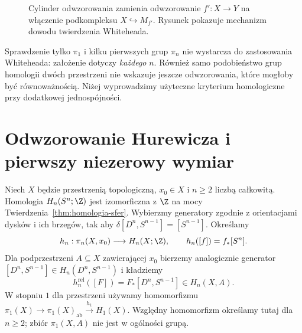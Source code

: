 \begin{figure}[!htbp]
\centering
{}
\caption{Cylinder odwzorowania zamienia
odwzorowanie $f':X\to Y$ na włączenie
podkompleksu $X\hookrightarrow M_{f'}$.
Rysunek pokazuje mechanizm dowodu
twierdzenia Whiteheada.}
\label{fig:cylinder-whiteheada}
\end{figure}

\begin{uwaga}
Sprawdzenie tylko $\pi_1$
i kilku pierwszych grup
$\pi_n$ nie wystarcza
do zastosowania Whiteheada:
założenie dotyczy
\emph{każdego} $n$.
Również samo podobieństwo
grup homologii dwóch
przestrzeni nie wskazuje
jeszcze odwzorowania, które
mogłoby być równoważnością.
Niżej wyprowadzimy
użyteczne kryterium
homologiczne przy
dodatkowej jednospójności.
\end{uwaga}

\section{Odwzorowanie Hurewicza i pierwszy niezerowy wymiar}
\label{sec:hurewicz-wyzszy}

\begin{definicja}
\label{def:mapa-hurewicza}
Niech $X$ będzie przestrzenią topologiczną,
$x_0\in X$ i $n\geq2$ liczbą całkowitą.
Homologia $H_n(S^n;\Z)$
jest izomorficzna z $\Z$
na mocy
Twierdzenia~\ref{thm:homologia-sfer}.
Wybierzmy generatory zgodnie z orientacjami dysków i ich brzegów,
tak aby $\delta[D^n,S^{n-1}]=[S^{n-1}]$.
Określamy
\[
 h_n:\pi_n(X,x_0)\longrightarrow H_n(X;\Z),
 \qquad h_n([f])=f_*[S^n].
\]
Dla podprzestrzeni $A\subseteq X$ zawierającej $x_0$
bierzemy analogicznie generator
$[D^n,S^{n-1}]
\in H_n(D^n,S^{n-1})$ i
kładziemy
\[
 h_n^{\mathrm{rel}}([F])
 =F_*[D^n,S^{n-1}]
 \in H_n(X,A).
\]
W stopniu $1$ dla przestrzeni używamy homomorfizmu
$\pi_1(X)\to\pi_1(X)_{\mathrm{ab}}\xrightarrow{h_1}H_1(X)$.
Względny homomorfizm określamy tutaj dla $n\geq2$;
zbiór $\pi_1(X,A)$ nie jest w ogólności grupą.
\end{definicja}

